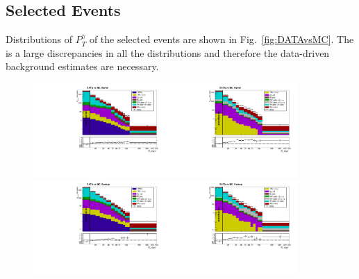 \subsection{Selected Events}


Distributions of $P_T^{\gamma}$ of the selected events are shown in Fig.~\ref{fig:DATAvsMC}. The is a large discrepancies in all the distributions and therefore the data-driven background estimates are necessary.

\begin{figure}[htb]
  \begin{center}
   \includegraphics[width=0.45\textwidth]{../figs/figs_v11/MUON_WGamma/PrepareYields/c_TotalDATAvsMC_Barrel__phoEt.pdf}\includegraphics[width=0.45\textwidth]{../figs/figs_v11/ELECTRON_WGamma/PrepareYields/c_TotalDATAvsMC_Barrel__phoEt.pdf}
   \includegraphics[width=0.45\textwidth]{../figs/figs_v11/MUON_WGamma/PrepareYields/c_TotalDATAvsMC_Endcap__phoEt.pdf}\includegraphics[width=0.45\textwidth]{../figs/figs_v11/ELECTRON_WGamma/PrepareYields/c_TotalDATAvsMC_Endcap__phoEt.pdf}

\end{center}
\end{figure}
